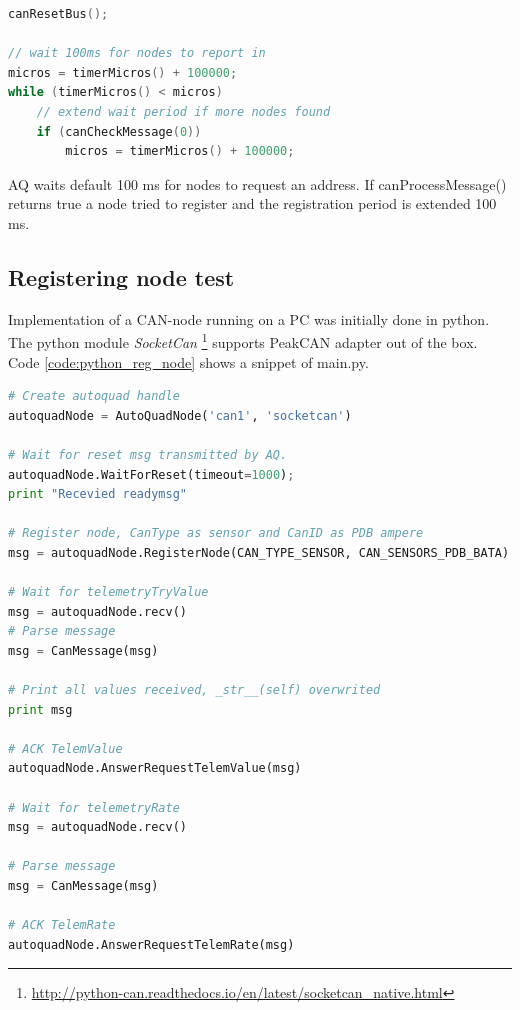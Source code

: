 \begin{lstlisting}[language = c, caption = Snippet showing AQ waits for devices, label=code:aq_req_extend_time]
canResetBus();

// wait 100ms for nodes to report in
micros = timerMicros() + 100000;
while (timerMicros() < micros)
    // extend wait period if more nodes found
    if (canCheckMessage(0))
        micros = timerMicros() + 100000;
\end{lstlisting}

AQ waits default 100 ms for nodes to request an address. If canProcessMessage() returns true a node tried to register and the registration period is extended 100 ms.
 
\subsection{Registering node test} \label{sec:reg_node_test}
Implementation of a CAN-node running on a PC was initially done in python. The python module \textit{SocketCan} \footnote{\url{http://python-can.readthedocs.io/en/latest/socketcan_native.html}} supports PeakCAN adapter out of the box.\\

Code \ref{code:python_reg_node} shows a snippet of main.py.

\begin{lstlisting}[language = python, caption = Snippet showing AQ registration from python, label=code:python_reg_node]
# Create autoquad handle
autoquadNode = AutoQuadNode('can1', 'socketcan')

# Wait for reset msg transmitted by AQ.
autoquadNode.WaitForReset(timeout=1000);
print "Recevied readymsg"

# Register node, CanType as sensor and CanID as PDB ampere
msg = autoquadNode.RegisterNode(CAN_TYPE_SENSOR, CAN_SENSORS_PDB_BATA)

# Wait for telemetryTryValue
msg = autoquadNode.recv()
# Parse message
msg = CanMessage(msg)

# Print all values received, _str__(self) overwrited
print msg

# ACK TelemValue
autoquadNode.AnswerRequestTelemValue(msg)

# Wait for telemetryRate
msg = autoquadNode.recv()

# Parse message
msg = CanMessage(msg)

# ACK TelemRate
autoquadNode.AnswerRequestTelemRate(msg)
\end{lstlisting}

